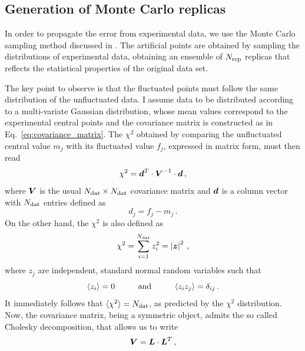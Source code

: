 \subsection*{Generation of Monte Carlo replicas}
In order to propagate the error from experimental data, we use the Monte Carlo sampling method discussed in . The artificial points are obtained by sampling the distributions of experimental data, obtaining an ensemble of $N_{\textrm{rep}}$ replicas that reflects the statistical properties of the original data set.%

The key point to observe is that the fluctuated points must follow the same distribution of the unfluctuated data. I assume data to be distributed according to a multi-variate Gaussian distribution, whose mean values correspond to the experimental central points and the covariance matrix is constructed as in Eq.~\eqref{eq:covariance_matrix}. The $\chi^2$ obtained by comparing the unfluctuated central value $m_j$ with its fluctuated value $f_j$, expressed in matrix form, must then read
\begin{equation}
  \chi^2 = {\vb*{d}}^{T} \cdot \vb*{V}^{-1} \cdot \vb*{d} \,,
  \label{eq:chi_fluc}
\end{equation}
where $\vb*{V}$ is the usual $N_{\textrm{dat}} \times N_{\textrm{dat}}$ covariance matrix and $\vb*{d}$ is a column vector with $N_{\textrm{dat}}$ entries defined as
\begin{equation}
  d_j = f_j - m_j \,.
\end{equation}
On the other hand, the $\chi^2$ is also defined as
\begin{equation}
  \chi^2 = \sum_{i=1}^{N_{\textrm{dat}}} z_i^2 = \left| \vb*{z} \right|^2 \,,
  \label{eq:chi2_normal}
\end{equation}
where $z_j$ are independent, standard normal random variables such that
\begin{equation}
  \langle z_i \rangle = 0 \hspace{10mm} \T{and} \hspace{10mm}  \langle z_i z_j \rangle = \delta_{ij} \,.
\end{equation}
It immediately follows that $\langle \chi^2 \rangle = N_{\textrm{dat}}$, as predicted by the $\chi^2$ distribution. Now, the covariance matrix, being a symmetric object, admits the so called Cholesky decomposition, that allows us to write
\begin{equation}
  \vb*{V} = \vb*{L} \cdot {\vb*{L}}^{T} \,,
\end{equation}

